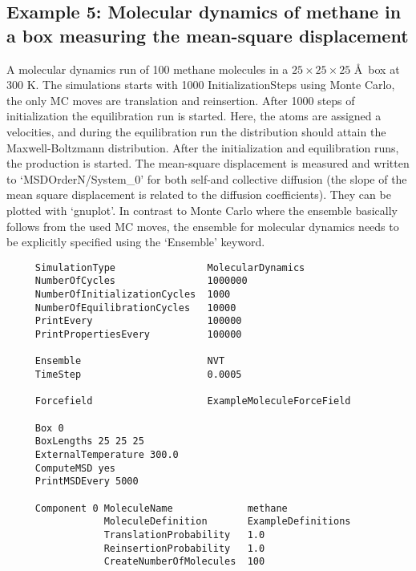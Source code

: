 \subsection*{Example 5: Molecular dynamics of methane in a box measuring the mean-square displacement}
A molecular dynamics run of 100 methane molecules in a $25\times25\times25$ \AA\ box at 300 K.
The simulations starts with 1000 InitializationSteps using Monte Carlo, the only MC moves are translation and reinsertion.
After 1000 steps of initialization the equilibration run is started. Here, the atoms are assigned a velocities,
and during the equilibration run the distribution should attain the Maxwell-Boltzmann distribution.
After the initialization and equilibration runs, the production is started. The mean-square displacement is
measured and written to `MSDOrderN/System\_0' for both self-and collective diffusion (the slope of the mean square
displacement is related to the diffusion coefficients). They can be plotted with `gnuplot'.
In contrast to Monte Carlo where the ensemble basically follows from the used MC moves, the ensemble for molecular dynamics
needs to be explicitly specified using the `Ensemble' keyword.

\begin{tiny}
\begin{verbatim}
     SimulationType                MolecularDynamics
     NumberOfCycles                1000000
     NumberOfInitializationCycles  1000
     NumberOfEquilibrationCycles   10000
     PrintEvery                    100000
     PrintPropertiesEvery          100000

     Ensemble                      NVT
     TimeStep                      0.0005

     Forcefield                    ExampleMoleculeForceField

     Box 0
     BoxLengths 25 25 25
     ExternalTemperature 300.0
     ComputeMSD yes
     PrintMSDEvery 5000

     Component 0 MoleculeName             methane
                 MoleculeDefinition       ExampleDefinitions
                 TranslationProbability   1.0
                 ReinsertionProbability   1.0
                 CreateNumberOfMolecules  100
\end{verbatim}
\end{tiny}

